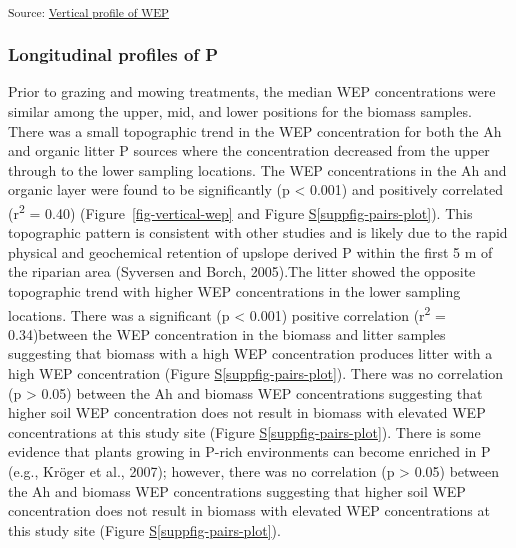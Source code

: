 \documentclass[
]{agujournal2019}
\newcommand*\quartosuppfigref[1]{Figure \hyperref[#1]{S\ref{#1}}}
\begin{document}
\textsubscript{Source:
\href{https://alex-koiter.github.io/riparian-grazing-manuscript/notebooks/04_Vertical_profile-preview.html\#cell-fig-vertical-WEP}{Vertical
profile of WEP}}

\subsubsection{Longitudinal profiles of
P}\label{longitudinal-profiles-of-p}

Prior to grazing and mowing treatments, the median WEP concentrations
were similar among the upper, mid, and lower positions for the biomass
samples. There was a small topographic trend in the WEP concentration
for both the Ah and organic litter P sources where the concentration
decreased from the upper through to the lower sampling locations. The
WEP concentrations in the Ah and organic layer were found to be
significantly (p \textless{} 0.001) and positively correlated
(r\textsuperscript{2} = 0.40) (Figure~\ref{fig-vertical-wep} and
\quartosuppfigref{suppfig-pairs-plot}). This topographic pattern is
consistent with other studies and is likely due to the rapid physical
and geochemical retention of upslope derived P within the first 5 m of
the riparian area (Syversen and Borch, 2005).The litter showed the
opposite topographic trend with higher WEP concentrations in the lower
sampling locations. There was a significant (p \textless{} 0.001)
positive correlation (r\textsuperscript{2} = 0.34)between the WEP
concentration in the biomass and litter samples suggesting that biomass
with a high WEP concentration produces litter with a high WEP
concentration (\quartosuppfigref{suppfig-pairs-plot}). There was no
correlation (p \textgreater{} 0.05) between the Ah and biomass WEP
concentrations suggesting that higher soil WEP concentration does not
result in biomass with elevated WEP concentrations at this study site
(\quartosuppfigref{suppfig-pairs-plot}). There is some evidence that
plants growing in P-rich environments can become enriched in P (e.g.,
Kröger et al., 2007); however, there was no correlation (p
\textgreater{} 0.05) between the Ah and biomass WEP concentrations
suggesting that higher soil WEP concentration does not result in biomass
with elevated WEP concentrations at this study site
(\quartosuppfigref{suppfig-pairs-plot}).
\end{document}
